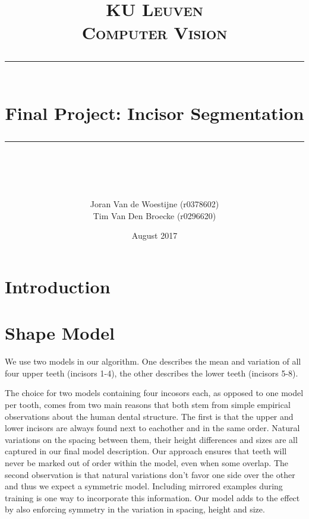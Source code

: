 \documentclass[a4paper,titlepage,12pt]{article}
\begin{document}
 
\newcommand{\horrule}[1]{\rule{\linewidth}{#1}}     %

\title{
        \normalfont \normalsize \textsc{KU Leuven} \\ [25pt]
        \normalfont \normalsize \textsc{Computer Vision} 
        \horrule{2pt} \\[0.5cm]
        \huge Final Project: Incisor Segmentation \\
        \horrule{2pt} \\[0.5cm]
}
\author{
        \normalfont            
        Joran Van de Woestijne (r0378602)\\
        Tim Van Den Broecke (r0296620)
}
\date{August 2017}
 
\maketitle

\newpage
\tableofcontents
\thispagestyle{empty}
\newpage
\setcounter{page}{1}

\section{Introduction}

\section{Shape Model}
We use two models in our algorithm. One describes the mean and variation of all four upper teeth (incisors 1-4), the other describes the lower teeth (incisors 5-8). 

The choice for two models containing four incosors each, as opposed to one model per tooth, comes from two main reasons that both stem from simple empirical observations about the human dental structure. The first is that the upper and lower incisors are always found next to eachother and in the same order. Natural variations on the spacing between them, their height differences and sizes are all captured in our final model description. Our approach ensures that teeth will never be marked out of order within the model, even when some overlap. The second observation is that natural variations don't favor one side over the other and thus we expect a symmetric model. Including mirrored examples during training is one way to incorporate this information. Our model adds to the effect by also enforcing symmetry in the variation in spacing, height and size.
\end{document}
